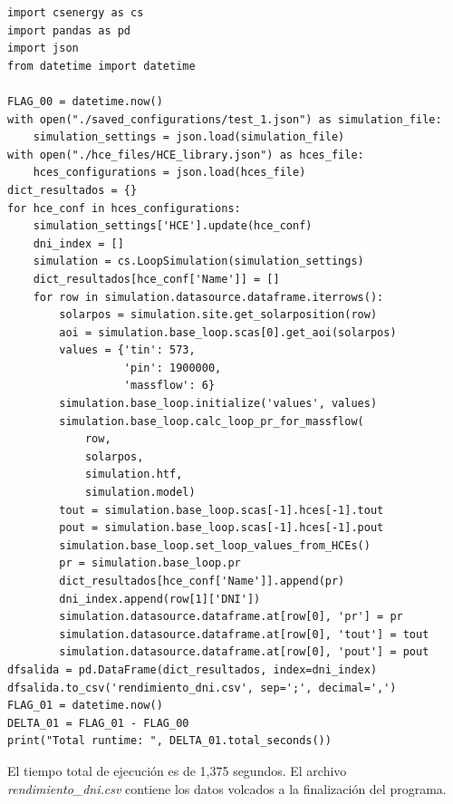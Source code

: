 \begin{lstlisting}[caption=Programa para el análisis del rendimiento en función de DNI, label={lst:script_test1}]
import csenergy as cs
import pandas as pd
import json
from datetime import datetime

FLAG_00 = datetime.now()
with open("./saved_configurations/test_1.json") as simulation_file:
    simulation_settings = json.load(simulation_file)
with open("./hce_files/HCE_library.json") as hces_file:
    hces_configurations = json.load(hces_file)
dict_resultados = {}
for hce_conf in hces_configurations:
    simulation_settings['HCE'].update(hce_conf)
    dni_index = []
    simulation = cs.LoopSimulation(simulation_settings)
    dict_resultados[hce_conf['Name']] = []
    for row in simulation.datasource.dataframe.iterrows():
        solarpos = simulation.site.get_solarposition(row)
        aoi = simulation.base_loop.scas[0].get_aoi(solarpos)
        values = {'tin': 573,
                  'pin': 1900000,
                  'massflow': 6}
        simulation.base_loop.initialize('values', values)
        simulation.base_loop.calc_loop_pr_for_massflow(
            row,
            solarpos,
            simulation.htf,
            simulation.model)
        tout = simulation.base_loop.scas[-1].hces[-1].tout
        pout = simulation.base_loop.scas[-1].hces[-1].pout
        simulation.base_loop.set_loop_values_from_HCEs()
        pr = simulation.base_loop.pr
        dict_resultados[hce_conf['Name']].append(pr)
        dni_index.append(row[1]['DNI'])
        simulation.datasource.dataframe.at[row[0], 'pr'] = pr
        simulation.datasource.dataframe.at[row[0], 'tout'] = tout
        simulation.datasource.dataframe.at[row[0], 'pout'] = pout
dfsalida = pd.DataFrame(dict_resultados, index=dni_index)
dfsalida.to_csv('rendimiento_dni.csv', sep=';', decimal=',')
FLAG_01 = datetime.now()
DELTA_01 = FLAG_01 - FLAG_00
print("Total runtime: ", DELTA_01.total_seconds())
\end{lstlisting}

El tiempo total de ejecución es de 1,375 segundos. El archivo \emph{rendimiento\_dni.csv} contiene los datos volcados a la finalización del programa.

